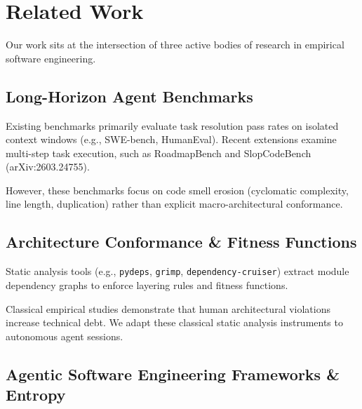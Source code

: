 \documentclass[11pt]{article}
\begin{document}

\section{Related Work}
\label{sec:related-work}

Our work sits at the intersection of three active bodies of research
in empirical software engineering.


\subsection{Long-Horizon Agent Benchmarks}
\label{sec:long-horizon-benchmarks}

Existing benchmarks primarily evaluate task resolution pass rates on
isolated context windows (e.g., SWE-bench, HumanEval). Recent
extensions examine multi-step task execution, such as RoadmapBench and
SlopCodeBench (arXiv:2603.24755).

However, these benchmarks focus on code smell erosion (cyclomatic
complexity, line length, duplication) rather than explicit
macro-architectural conformance.


\subsection{Architecture Conformance \& Fitness Functions}
\label{sec:architecture-conformance}

Static analysis tools (e.g., \texttt{pydeps}, \texttt{grimp},
\texttt{dependency-cruiser}) extract module dependency graphs to
enforce layering rules and fitness functions.

Classical empirical studies demonstrate that human architectural
violations increase technical debt. We adapt these classical static
analysis instruments to autonomous agent sessions.


\subsection{Agentic Software Engineering Frameworks \& Entropy}
\label{sec:agentic-entropy}
\end{document}
